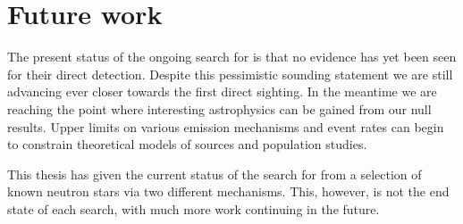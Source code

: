 

\chapter{Future work}
The present status of the ongoing search for \gws is that no evidence has yet been seen for their
direct detection. Despite this pessimistic sounding statement we are still advancing ever closer
towards the first direct sighting. In the meantime we are reaching the point where interesting
astrophysics can be gained from our null results. Upper limits on various emission mechanisms and
event rates can begin to constrain theoretical models of sources and population studies.

This thesis has given the current status of the search for \gws from a selection of known neutron
stars via two different mechanisms. This, however, is not the end state of each search, with much
more work continuing in the future. 

